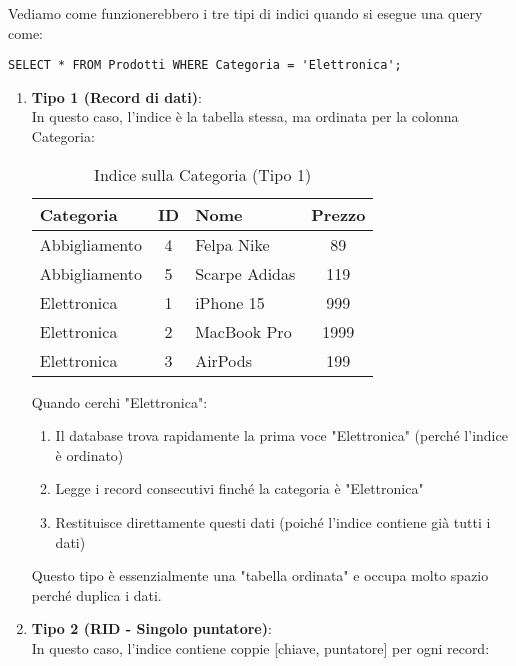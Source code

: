Vediamo come funzionerebbero i tre tipi di indici quando si esegue una query come:
\begin{verbatim}
SELECT * FROM Prodotti WHERE Categoria = 'Elettronica';
\end{verbatim}

\begin{enumerate}
    \item \textbf{Tipo 1 (Record di dati)}:\\
    In questo caso, l'indice è la tabella stessa, ma ordinata per la colonna Categoria:
    
    \begin{table}[H]
    \centering
    \begin{tabular}{|l|c|l|c|}
    \hline
    \textbf{Categoria} & \textbf{ID} & \textbf{Nome} & \textbf{Prezzo} \\
    \hline
    Abbigliamento & 4 & Felpa Nike & 89 \\
    Abbigliamento & 5 & Scarpe Adidas & 119 \\
    Elettronica & 1 & iPhone 15 & 999 \\
    Elettronica & 2 & MacBook Pro & 1999 \\
    Elettronica & 3 & AirPods & 199 \\
    \hline
    \end{tabular}
    \caption{Indice sulla Categoria (Tipo 1)}
    \end{table}
    
    Quando cerchi "Elettronica":
    \begin{enumerate}
        \item Il database trova rapidamente la prima voce "Elettronica" (perché l'indice è ordinato)
        \item Legge i record consecutivi finché la categoria è "Elettronica"
        \item Restituisce direttamente questi dati (poiché l'indice contiene già tutti i dati)
    \end{enumerate}
    
    Questo tipo è essenzialmente una "tabella ordinata" e occupa molto spazio perché duplica i dati.
    
    \item \textbf{Tipo 2 (RID - Singolo puntatore)}:\\
    In questo caso, l'indice contiene coppie [chiave, puntatore] per ogni record:
    

\end{enumerate}
